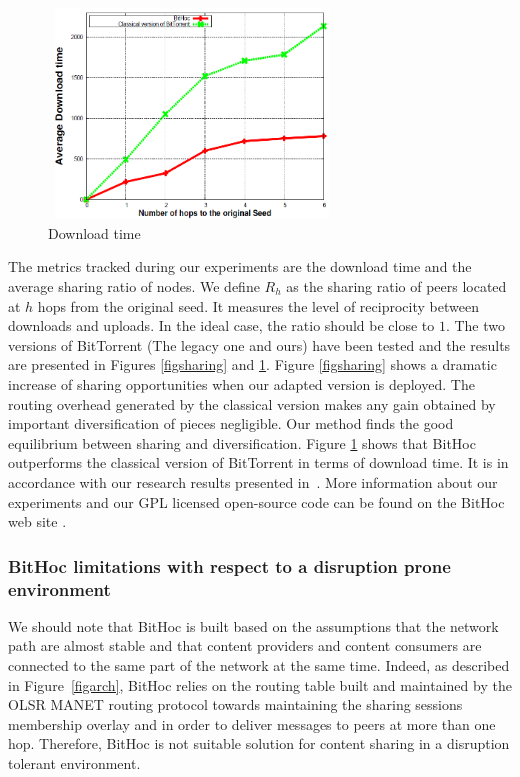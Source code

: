 \begin{figure}[!h]
  \begin{center}
    \includegraphics[width=3in,height=2.2in]{Chapitre2/downloadtime.png}
  \end{center}
  \caption{Download time}
  \label{FigDownloadtime}
\end{figure}

The metrics tracked during our experiments are the download time and the average sharing ratio of nodes. We define $R_{h}$ as the sharing ratio of peers located at $h$ hops from the original seed. It measures the level of reciprocity between downloads and uploads. In the ideal case, the ratio should be close to $1$. The two versions of BitTorrent (The legacy one and ours) have been tested and the results are presented in Figures \ref{figsharing} and \ref{FigDownloadtime}. Figure \ref{figsharing} shows a dramatic increase of sharing opportunities when our adapted version is deployed. The routing overhead generated by the classical version makes any gain obtained by important diversification of pieces negligible. Our method finds the good equilibrium between sharing and diversification. Figure \ref{FigDownloadtime} shows that BitHoc outperforms the classical version of BitTorrent in terms of download time. It is in accordance with our research results presented in~\cite{BitHocWeb}. More information about our experiments and our GPL licensed open-source code can be found on the BitHoc web site \cite{BitHocWeb}.

\subsubsection{BitHoc limitations with respect to a disruption prone environment}
\label{BitHoc:limitations}

We should note that BitHoc is built based on the assumptions that the network path are almost stable and that content providers and content consumers are connected to the same part of the network at the same time. Indeed, as described in Figure~\ref{figarch}, BitHoc relies on the routing table built and maintained by the OLSR MANET routing protocol towards maintaining the sharing sessions membership overlay and in order to deliver messages to peers at more than one hop. Therefore, BitHoc is not suitable solution for content sharing in a disruption tolerant environment. 

